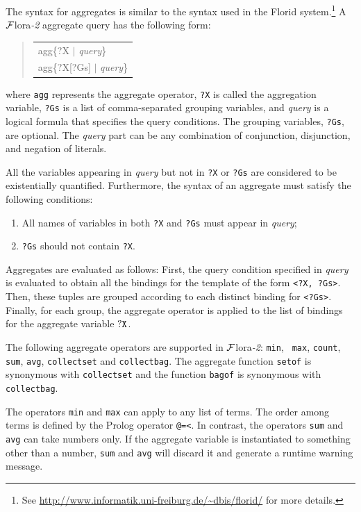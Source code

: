 \documentclass[11pt]{article}
\newenvironment{qrules}{\begin{quote}\tt\begin{tabular}[t]{l}}%
{\end{tabular}\end{quote}}
\newcommand{\FLORA}{{\mbox{\sc ${\cal F}${lora}\rm\emph{-2}}}\xspace}
\newcommand{\FLORID}{{\mbox{\sc Florid}}\xspace}
\begin{document}
The syntax for aggregates is similar to the syntax used in the \FLORID
system.\footnote{
  See \url{http://www.informatik.uni-freiburg.de/~dbis/florid/} for more
  details.
}
A \FLORA aggregate query has the following form:
\begin{qrules}
agg\{?X $|$ {\it query}\}\\
agg\{?X[?Gs] $|$ {\it query}\}
\end{qrules}
%
where {\tt agg} represents the aggregate operator, {\tt ?X} is called the
aggregation variable, {\tt ?Gs} is a list of comma-separated grouping
variables, and {\it query} is a logical formula that specifies the
query conditions. The grouping variables, {\tt ?Gs}, are optional. The {\it
query} part
can be any combination of conjunction, disjunction, and negation of literals.

All the variables appearing in {\it query} but not in {\tt ?X} or {\tt ?Gs} are
considered to be existentially quantified. Furthermore, the syntax of an
aggregate must satisfy the following conditions:
\begin{enumerate}
\item All names of variables in both {\tt ?X} and {\tt ?Gs} must
appear in {\it query};
\item {\tt ?Gs} should not contain {\tt ?X}.
\end{enumerate}

Aggregates are evaluated as follows: First, the query
condition specified in {\it query} is evaluated to obtain all the bindings
for the template of the form {\tt \texttt{<}?X, ?Gs\texttt{>}}. Then, these
tuples are grouped according to each distinct binding for
{\tt \texttt{<}?Gs\texttt{>}}. Finally, for each group, the aggregate operator
is applied to the list of bindings for the aggregate variable $\tt ?X$.


%
The following aggregate operators are supported in \FLORA: {\tt min}, {\tt
  max}, {\tt count}, {\tt sum}, {\tt avg}, {\tt collectset}
  and {\tt collectbag}. The aggregate
function {\tt setof} is synonymous with
{\tt collectset} and the function {\tt bagof} is synonymous with {\tt
  collectbag}.

The operators {\tt min} and {\tt max} can apply to any list of
terms. The order among terms is defined by the Prolog operator {\tt @=<}.  In
contrast, the operators {\tt sum} and {\tt avg} can take numbers only. If
the aggregate variable is instantiated to something other than a
number, {\tt sum} and {\tt avg} will discard it and generate a runtime
warning message.
\end{document}
